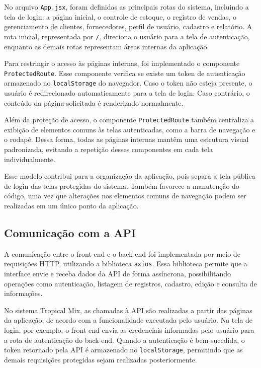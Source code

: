 No arquivo \texttt{App.jsx}, foram definidas as principais rotas do sistema, incluindo a tela de login, a página inicial, o controle de estoque, o registro de vendas, o gerenciamento de clientes, fornecedores, perfil de usuário, cadastro e relatório. A rota inicial, representada por \texttt{/}, direciona o usuário para a tela de autenticação, enquanto as demais rotas representam áreas internas da aplicação.

Para restringir o acesso às páginas internas, foi implementado o componente \texttt{ProtectedRoute}. Esse componente verifica se existe um token de autenticação armazenado no \texttt{localStorage} do navegador. Caso o token não esteja presente, o usuário é redirecionado automaticamente para a tela de login. Caso contrário, o conteúdo da página solicitada é renderizado normalmente.

Além da proteção de acesso, o componente \texttt{ProtectedRoute} também centraliza a exibição de elementos comuns às telas autenticadas, como a barra de navegação e o rodapé. Dessa forma, todas as páginas internas mantêm uma estrutura visual padronizada, evitando a repetição desses componentes em cada tela individualmente.

Esse modelo contribui para a organização da aplicação, pois separa a tela pública de login das telas protegidas do sistema. Também favorece a manutenção do código, uma vez que alterações nos elementos comuns de navegação podem ser realizadas em um único ponto da aplicação.

\subsection{Comunicação com a API}

A comunicação entre o front-end e o back-end foi implementada por meio de requisições HTTP, utilizando a biblioteca \texttt{axios}. Essa biblioteca permite que a interface envie e receba dados da API de forma assíncrona, possibilitando operações como autenticação, listagem de registros, cadastro, edição e consulta de informações.

No sistema Tropical Mix, as chamadas à API são realizadas a partir das páginas da aplicação, de acordo com a funcionalidade executada pelo usuário. Na tela de login, por exemplo, o front-end envia as credenciais informadas pelo usuário para a rota de autenticação do back-end. Quando a autenticação é bem-sucedida, o token retornado pela API é armazenado no \texttt{localStorage}, permitindo que as demais requisições protegidas sejam realizadas posteriormente.


